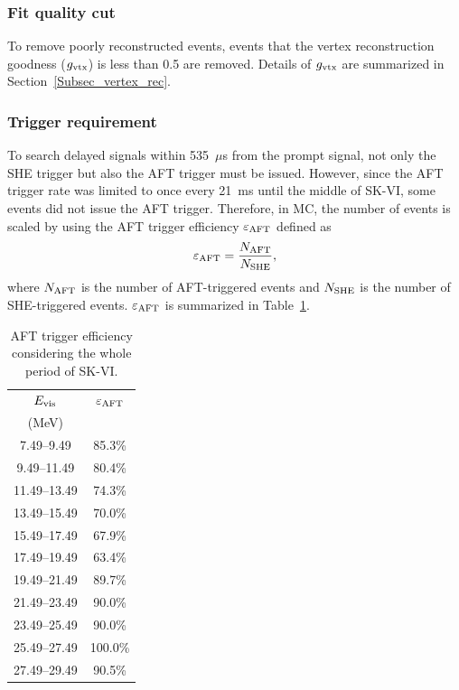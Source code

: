\subsubsection{Fit quality cut}
\vs\hs
To remove poorly reconstructed events, events that the vertex reconstruction goodness ($g_{\rm vtx}$) is less than 0.5 are removed.
Details of $g_{\rm vtx}$ are summarized in Section~\ref{Subsec_vertex_rec}.

\subsubsection{Trigger requirement}
\vs\hs
To search delayed signals within 535~$\mu$s from the prompt signal, not only the SHE trigger but also the AFT trigger must be issued.
However, since the AFT trigger rate was limited to once every 21~ms until the middle of SK-VI, some events did not issue the AFT trigger.
Therefore, in MC, the number of events is scaled by using the AFT trigger efficiency $\varepsilon_{\rm AFT}$ defined as
\begin{eqnarray}
	\varepsilon_{\rm AFT} = {N_{\rm AFT} \over N_{\rm SHE}},
\end{eqnarray}
where $N_{\rm AFT}$ is the number of AFT-triggered events and $N_{\rm SHE}$ is the number of SHE-triggered events.
$\varepsilon_{\rm AFT}$ is summarized in Table~\ref{tab:AFT}.

\begin{table}[h]
	\centering
	\caption[AFT trigger efficiency considering the whole period of SK-VI]{
	AFT trigger efficiency considering the whole period of SK-VI.
	}\label{tab:AFT}
	\vs
	\begin{tabular}{cc} \hline \hline
		$E_{\rm vis}$ & $\varepsilon_{\rm AFT}$ \\
		(MeV)         &                         \\ \hline
		7.49--9.49    & 85.3\%                  \\
		9.49--11.49   & 80.4\%                  \\
		11.49--13.49  & 74.3\%                  \\
		13.49--15.49  & 70.0\%                  \\
		15.49--17.49  & 67.9\%                  \\
		17.49--19.49  & 63.4\%                  \\
		19.49--21.49  & 89.7\%                  \\
		21.49--23.49  & 90.0\%                  \\
		23.49--25.49  & 90.0\%                  \\
		25.49--27.49  & 100.0\%                 \\
		27.49--29.49  & 90.5\%                  \\ \hline \hline
	\end{tabular}
\end{table}





